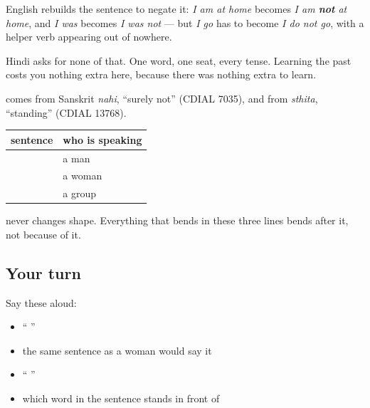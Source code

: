 \begin{cousinweb}
English rebuilds the sentence to negate it: \emph{I am at home} becomes \emph{I am \textbf{not} at home}, and \emph{I was} becomes \emph{I was not} — but \emph{I go} has to become \emph{I do not go}, with a helper verb appearing out of nowhere.

Hindi asks for none of that. One word, one seat, every tense. Learning the past costs you nothing extra here, because there was nothing extra to learn.

\textbf{} comes from Sanskrit \emph{nahi}, \textquotedblleft{}surely not\textquotedblright{} (CDIAL 7035), and \textbf{} from \emph{sthita}, \textquotedblleft{}standing\textquotedblright{} (CDIAL 13768).
\end{cousinweb}

\begin{grammarlens}[title={Grammar Lens: the seat in front of the verb}]
\noindent
\begin{tabularx}{\linewidth}{@{}>{\raggedright\arraybackslash}X>{\raggedright\arraybackslash}X@{}}
\toprule
\textbf{sentence} & \textbf{who is speaking} \\
\midrule
\hi{मैं} \hi{घर} \hi{पर} \hi{नहीं} \hi{था।} & a man \\
\hi{मैं} \hi{घर} \hi{पर} \hi{नहीं} \hi{थी।} & a woman \\
\hi{हम} \hi{घर} \hi{पर} \hi{नहीं} \hi{थे।} & a group \\
\bottomrule
\end{tabularx}

 never changes shape. Everything that bends in these three lines bends after it, not because of it.
\end{grammarlens}

\subsection*{Your turn}
Say these aloud:

\begin{itemize}
\raggedright
  \item \textquotedblleft{}    \textquotedblright{}
  \item the same sentence as a woman would say it
  \item \textquotedblleft{}    \textquotedblright{}
  \item which word in the sentence  stands in front of
\end{itemize}

